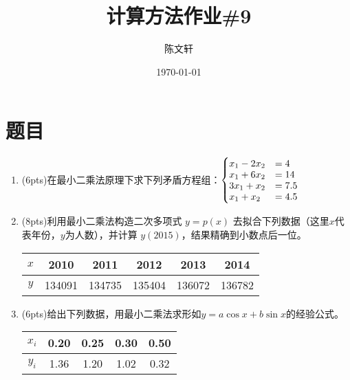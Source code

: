 \documentclass[cn,hazy,green,11pt,normal]{elegantnote}
\title{计算方法作业\#9}
\author{陈文轩}
\institute{KFRC}
\date{\today}
\begin{document}
\maketitle

\section{题目}


    \begin{enumerate}

    \item (6pts)在最小二乘法原理下求下列矛盾方程组：$\begin{cases}x_1-2x_2&=4\vspace{-0.1cm}\\x_1+6x_2&=14\vspace{-0.1cm}\\3x_1+x_2&=7.5\vspace{-0.1cm}\\x_1+x_2&=4.5\end{cases}$

    \item (8pts)利用最小二乘法构造二次多项式 $y=p(x)$ 去拟合下列数据（这里$x$代表年份，$y$为人数），并计算 $y(2015)$，结果精确到小数点后一位。

        \begin{table}[H]
            \centering
            \begin{tabular}{|c|c|c|c|c|c|}
                \hline
                $x$ & 2010 & 2011 & 2012 & 2013 & 2014 \\
                \hline
                $y$ & 134091 & 134735 & 135404 & 136072 & 136782 \\
                \hline
            \end{tabular}
            \label{tab:1}
        \end{table}


    \item (6pts)给出下列数据，用最小二乘法求形如$y=a\cos x+b\sin x$的经验公式。

        \begin{table}[H]
            \centering
            \begin{tabular}{|c|c|c|c|c|}
                \hline
                $x_i$ & 0.20 & 0.25 & 0.30 & 0.50 \\
                \hline
                $y_i$ & 1.36 & 1.20 & 1.02 & 0.32 \\
                \hline
            \end{tabular}
            \label{tab:2}
        \end{table}



\end{enumerate}
\end{document}
